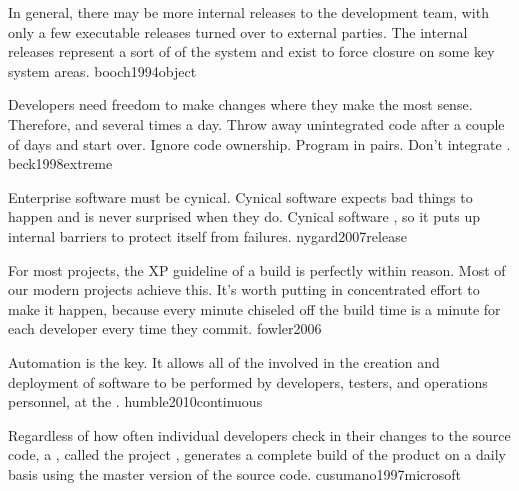 \documentclass{article}
\begin{document}


  {In general, there may be more internal releases to the development team, with only a few executable releases turned over to external parties. The internal releases represent a sort of  of the system and exist to force closure on some key system areas.}
  {booch1994object}

  {Developers need freedom to make changes where they make the most sense. Therefore,  and  several times a day. Throw away unintegrated code after a couple of days and start over. Ignore code ownership. Program in pairs. Don't integrate .}
  {beck1998extreme}

  {Enterprise software must be cynical. Cynical software expects bad things to happen and is never surprised when they do. Cynical software , so it puts up internal barriers to protect itself from failures.}
  {nygard2007release}


  {For most projects, the XP guideline of a  build is perfectly within reason. Most of our modern projects achieve this. It's worth putting in concentrated effort to make it happen, because every minute chiseled off the build time is a minute  for each developer every time they commit.}
  {fowler2006}

  {Automation is the key. It allows all of the  involved in the creation and deployment of software to be performed by developers, testers, and operations personnel, at the .}
  {humble2010continuous}


  {Regardless of how often individual developers check in their changes to the source code, a , called the project , generates a complete build of the product on a daily basis using the master version of the source code.}
  {cusumano1997microsoft}
\end{document}
